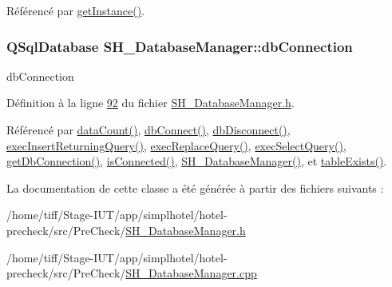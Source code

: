Référencé par \hyperlink{classSH__DatabaseManager_a31198eb4de0f8b18e3fa0eed09f24d19}{get\-Instance()}.

\hypertarget{classSH__DatabaseManager_a9291f61c3abbba2c4f1567b1d8325f0e}{
\subsubsection[{db\-Connection}]{\setlength{\rightskip}{0pt plus 5cm}Q\-Sql\-Database S\-H\-\_\-\-Database\-Manager\-::db\-Connection\hspace{0.3cm}{\ttfamily [protected]}}}\label{classSH__DatabaseManager_a9291f61c3abbba2c4f1567b1d8325f0e}


db\-Connection 



Définition à la ligne \hyperlink{SH__DatabaseManager_8h_source_l00092}{92} du fichier \hyperlink{SH__DatabaseManager_8h_source}{S\-H\-\_\-\-Database\-Manager.\-h}.



Référencé par \hyperlink{classSH__DatabaseManager_ad3e372d89b60b43e3f3bae649be6d7fb}{data\-Count()}, \hyperlink{classSH__DatabaseManager_ab634ce39ef483e7ad2fe08d4b8ba74f7}{db\-Connect()}, \hyperlink{classSH__DatabaseManager_a096c26457bbb03f92283c5d104401e90}{db\-Disconnect()}, \hyperlink{classSH__DatabaseManager_a55268fae16792142072af49238f7bb94}{exec\-Insert\-Returning\-Query()}, \hyperlink{classSH__DatabaseManager_a25e0f24d7833c2728f55b85be529063d}{exec\-Replace\-Query()}, \hyperlink{classSH__DatabaseManager_ab8f9850cb68444ab9a4e613b36a3b044}{exec\-Select\-Query()}, \hyperlink{classSH__DatabaseManager_a0ce86f671946975c2e7b4ad50c9a92a2}{get\-Db\-Connection()}, \hyperlink{classSH__DatabaseManager_aba5832c8be2fe4894781c9bf34be5b8b}{is\-Connected()}, \hyperlink{classSH__DatabaseManager_a7b5d0e372c153eb59cdab98588994904}{S\-H\-\_\-\-Database\-Manager()}, et \hyperlink{classSH__DatabaseManager_ac18f4ee3abd86cb0db25b3cb593e28b8}{table\-Exists()}.



La documentation de cette classe a été générée à partir des fichiers suivants \-:\begin{DoxyCompactItemize}
\item 
/home/tiff/\-Stage-\/\-I\-U\-T/app/simplhotel/hotel-\/precheck/src/\-Pre\-Check/\hyperlink{SH__DatabaseManager_8h}{S\-H\-\_\-\-Database\-Manager.\-h}\item 
/home/tiff/\-Stage-\/\-I\-U\-T/app/simplhotel/hotel-\/precheck/src/\-Pre\-Check/\hyperlink{SH__DatabaseManager_8cpp}{S\-H\-\_\-\-Database\-Manager.\-cpp}\end{DoxyCompactItemize}
